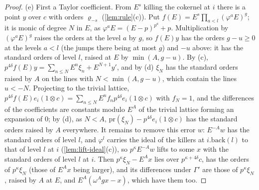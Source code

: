 \begin{proof}
(e) First a Taylor coefficient. From $E^s$ killing the cokernel at $i$ there is a point $y$ over $c$ with orders $\varrho_{-s}$ (\cref{lem:rule}(c)). Put $f(E)=E^s\prod_{a<l}(\varphi^aE)^g$; it is monic of degree $N$ in $E$, as $\varphi^aE=(E-p)^{p^a}+p$. Multiplication by $(\varphi^aE)^g$ raises the orders at the level $a$ by $g$,
so $f(E)y$ has the orders $g-u\ge0$ at the levels $a<l$ (the jumps there being at most $g$) and $-u$ above: it has the standard orders of level $l$, raised at $E$ by $\min(A,g-u)$. By (c), $p^{4\delta}f(E)y=\sum_{n\le N}E^n\xi_n+E^{N+1}y'$, and by (d) $\xi_N$ has the standard orders raised by $A$ on the lines
with $N<\min(A,g-u)$, which contain the lines $u<-N$. Projecting to the trivial lattice, $p^{4\delta}f(E)e_i(1\otimes c)=\sum_{n\le N}E^nf_np^{4\delta}e_i(1\otimes c)$ with $f_N=1$, and the differences of the coefficients are constants modulo $E^A$ of the trivial lattice forming an expansion of $0$; by (d), as $N<A$,
$\mathrm{pr}(\xi_N)-p^{4\delta}e_i(1\otimes c)$ has the standard orders raised by $A$ everywhere. It remains to remove this error $w$: $E^{-A}w$ has the standard orders of level $l$, and $\varphi^l$ carries the ideal of the killers at $i.\mathrm{back}(l)$ to that of level $l$ at $i$ (\cref{lem:lift-ideal}(c)), so $p^\kappa E^{-A}w$
lifts to some $x$ with the standard orders of level $l$ at $i$. Then $p^\kappa\xi_N-E^Ax$ lies over $p^{\kappa+4\delta}c$, has the orders of $p^\kappa\xi_N$ (those of $E^Ax$ being larger), and its differences under $\Gamma'$ are those of $p^\kappa\xi_N$, raised by $A$ at $E$, and $E^A(\omega^Agx-x)$, which have them
too.
\end{proof}

